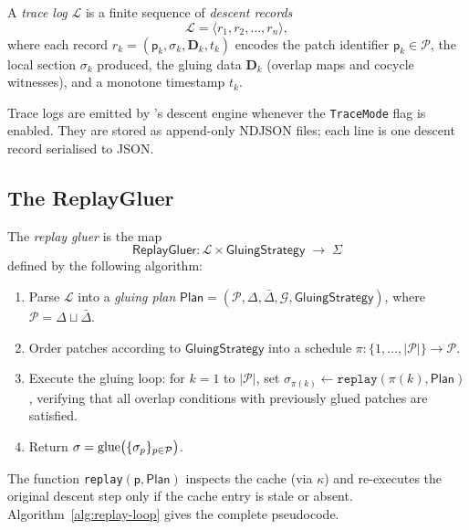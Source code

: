 \documentclass[11pt]{article}
\newcommand{\Gluer}{\mathsf{ReplayGluer}}
\newcommand{\GluingStrat}{\mathsf{GluingStrategy}}
\newcommand{\TraceLog}{\mathcal{L}}
\newcommand{\Patch}{\mathsf{p}}
\newcommand{\PatchSet}{\mathcal{P}}
\newcommand{\GluingPlan}{\mathsf{Plan}}
\newcommand{\CacheFn}{\kappa}
\newcommand{\GS}{\sigma}                   %
\newcommand{\GSspace}{\Sigma}              %
\newcommand{\ChangedSet}{\Delta}
\newcommand{\UnchangedSet}{\bar\Delta}
\newcommand{\DepGraph}{\mathcal{G}}
\newcommand{\GluingData}{\mathbf{D}}
\begin{document}
\begin{definition}
A \emph{trace log} $\TraceLog$ is a finite sequence of \emph{descent
records}
\[
  \TraceLog = \langle r_1, r_2, \ldots, r_n \rangle,
\]
where each record $r_k = (\Patch_k, \GS_k, \GluingData_k, t_k)$
encodes the patch identifier $\Patch_k \in \PatchSet$, the local section
$\GS_k$ produced, the gluing data $\GluingData_k$ (overlap maps and
cocycle witnesses), and a monotone timestamp $t_k$.
\end{definition}

Trace logs are emitted by \JuGeo's descent engine whenever the
\texttt{TraceMode} flag is enabled.  They are stored as append-only
NDJSON files; each line is one descent record serialised to JSON.

\subsection{The ReplayGluer}

\begin{definition}[ReplayGluer]
\label{def:replay-gluer}
The \emph{replay gluer} is the map
\[
  \Gluer\colon \TraceLog \times \GluingStrat \;\longrightarrow\; \GSspace
\]
defined by the following algorithm:
\begin{enumerate}
\item Parse $\TraceLog$ into a \emph{gluing plan}
  $\GluingPlan = (\PatchSet, \ChangedSet, \UnchangedSet, \DepGraph,
  \GluingStrat)$, where $\PatchSet = \ChangedSet \sqcup \UnchangedSet$.
\item Order patches according to $\GluingStrat$ into a schedule
  $\pi\colon \{1,\ldots,|\PatchSet|\} \to \PatchSet$.
\item Execute the gluing loop: for $k = 1$ to $|\PatchSet|$, set
  $\GS_{\pi(k)} \leftarrow \mathtt{replay}(\pi(k), \GluingPlan)$,
  verifying that all overlap conditions with previously glued patches
  are satisfied.
\item Return $\GS = \glue\bigl(\{\GS_p\}_{p \in \PatchSet}\bigr)$.
\end{enumerate}
\end{definition}

The function \texttt{replay}$(\Patch, \GluingPlan)$ inspects the cache
(via $\CacheFn$) and re-executes the original descent step only if the
cache entry is stale or absent.  Algorithm~\ref{alg:replay-loop} gives
the complete pseudocode.
\end{document}
